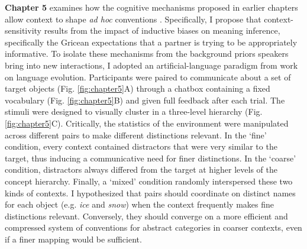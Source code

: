 \documentclass[11pt]{article}
\begin{document}
\textbf{Chapter 5} examines how the cognitive mechanisms proposed in earlier chapters allow context to shape \emph{ad hoc} conventions \cite{hawkins_emerging_abstractions_2018}.
Specifically, I propose that context-sensitivity results from the impact of inductive biases on meaning inference, specifically the Gricean expectations that a partner is trying to be appropriately informative.
To isolate these mechanisms from the background priors speakers bring into new interactions, I adopted an artificial-language paradigm from work on language evolution.
Participants were paired to communicate about a set of target objects (Fig. \ref{fig:chapter5}A) through a chatbox containing a fixed vocabulary (Fig. \ref{fig:chapter5}B) and given full feedback after each trial.
The stimuli were designed to visually cluster in a three-level hierarchy (Fig. \ref{fig:chapter5}C).
Critically, the statistics of the environment were manipulated across different pairs to make different distinctions relevant. 
In the `fine' condition, every context contained distractors that were very similar to the target, thus inducing a communicative need for finer distinctions. 
In the `coarse' condition, distractors always differed from the target at higher levels of the concept hierarchy.  
Finally, a `mixed' condition randomly interspersed these two kinds of contexts.
I hypothesized that pairs should coordinate on distinct names for each object (e.g. \emph{ice} and \emph{snow}) when the context frequently makes fine distinctions relevant. 
Conversely, they should converge on a more efficient and compressed system of conventions for abstract categories in coarser contexts, even if a finer mapping would be sufficient.
\end{document}
